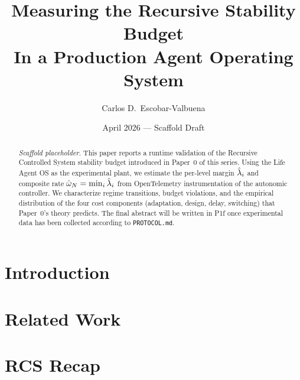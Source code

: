 \documentclass[11pt,a4paper]{article}
\title{Measuring the Recursive Stability Budget\\
In a Production Agent Operating System}
\author{Carlos D.\ Escobar-Valbuena}
\date{April 2026 --- Scaffold Draft}
\begin{document}
\maketitle

\begin{abstract}
\emph{Scaffold placeholder.} This paper reports a runtime validation of
the Recursive Controlled System stability budget introduced in Paper~0
of this series. Using the Life Agent OS as the experimental
plant, we estimate the per-level margin $\hat{\lambda}_i$ and composite
rate $\hat{\omega}_N = \min_i \hat{\lambda}_i$ from OpenTelemetry
instrumentation of the autonomic controller. We characterize regime
transitions, budget violations, and the empirical distribution of the
four cost components (adaptation, design, delay, switching) that
Paper~0's theory predicts. The final abstract will be written in
P1f once experimental data has been collected according to
\texttt{PROTOCOL.md}.
\end{abstract}

\tableofcontents
\newpage

\section{Introduction}
\label{sec:introduction}

\section{Related Work}
\label{sec:related}

\section{RCS Recap}
\label{sec:recap}
\end{document}
